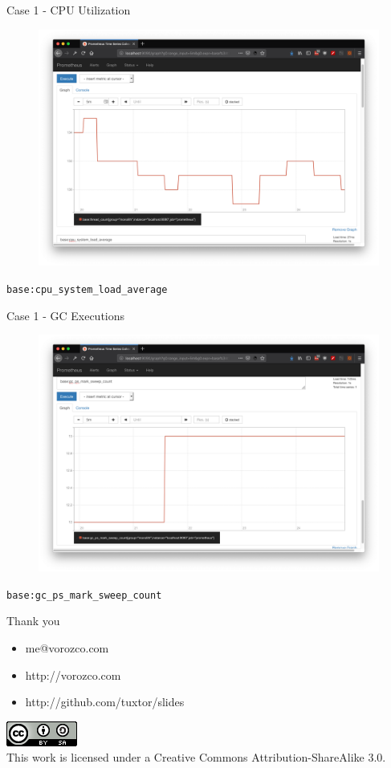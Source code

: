 \documentclass{beamer}
\begin{document}
\begin{frame}{Case 1 - CPU Utilization}

\begin{figure}
	\centering
	\includegraphics[width=0.8\linewidth]{Images/mono2}
\end{figure}
\lstinline|base:cpu_system_load_average|
\end{frame}

\begin{frame}{Case 1 - GC Executions}

\begin{figure}
	\centering
	\includegraphics[width=0.8\linewidth]{Images/mono3}
\end{figure}
\lstinline|base:gc_ps_mark_sweep_count|
\end{frame}





\begin{frame}{Thank you}
\begin{itemize}
\item me@vorozco.com
\item http://vorozco.com
\item http://github.com/tuxtor/slides
\end{itemize}
\begin{center}
\includegraphics[width=0.1\linewidth]{Images/cclogo}
\\
This work is licensed under a Creative Commons Attribution-ShareAlike 3.0.
\end{center}
\end{frame}
\end{document}
